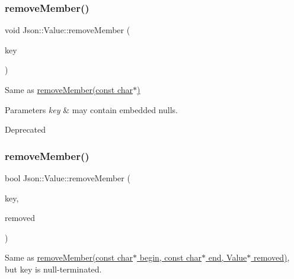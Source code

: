 \subsubsection{\texorpdfstring{remove\+Member()}{removeMember()}\hspace{0.1cm}{\footnotesize\ttfamily [2/4]}}
{\footnotesize\ttfamily void Json\+::\+Value\+::remove\+Member (\begin{DoxyParamCaption}\item[{const J\+S\+O\+N\+C\+P\+P\+\_\+\+S\+T\+R\+I\+NG \&}]{key }\end{DoxyParamCaption})}

Same as \hyperlink{classJson_1_1Value_a92e165f04105d27a930fb3a18a053585}{remove\+Member(const char$\ast$)} 
\begin{DoxyParams}{Parameters}
{\em key} & may contain embedded nulls. \\
\hline
\end{DoxyParams}
\begin{DoxyRefDesc}{Deprecated}
\item[\hyperlink{deprecated__deprecated000002}{Deprecated}]\end{DoxyRefDesc}
\mbox{\label{classJson_1_1Value_a708e599489adf30d65bf85a8ee16e6fb}} 
\subsubsection{\texorpdfstring{remove\+Member()}{removeMember()}\hspace{0.1cm}{\footnotesize\ttfamily [3/4]}}
{\footnotesize\ttfamily bool Json\+::\+Value\+::remove\+Member (\begin{DoxyParamCaption}\item[{const char $\ast$}]{key,  }\item[{\hyperlink{classJson_1_1Value}{Value} $\ast$}]{removed }\end{DoxyParamCaption})}

Same as \hyperlink{classJson_1_1Value_a49c91af727d6b4eb0af02a81bb2def87}{remove\+Member(const char$\ast$ begin, const char$\ast$ end, Value$\ast$ removed)}, but \textquotesingle{}key\textquotesingle{} is null-\/terminated. \mbox{\label{classJson_1_1Value_ae385ecef98427970df525ee876e9f54a}} 
